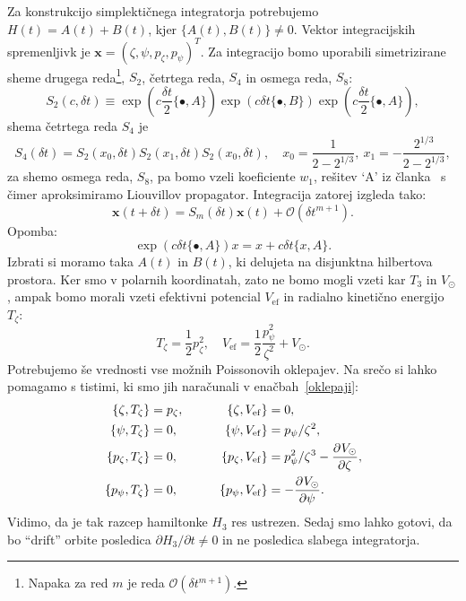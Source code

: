 \documentclass[12pt, a4paper]{article}
\newcommand{\sfrac}[2]{
    \ensuremath{\textstyle{\frac{#1}{#2}}}
}
\newcommand{\der}[3][]{
    \ensuremath{ \frac{\partial^{#1} #2}{\partial #3^{#1}} }
}
\newcommand{\Vef}{
    \ensuremath{V_\mathrm{ef}}
}
\begin{document}
Za konstrukcijo simplekti\v cnega integratorja potrebujemo $H(t) = A(t) + B(t)$, kjer $\{A(t), B(t)\} \neq 0$.
Vektor integracijskih spremenljivk je $\mathbf{x} = (\zeta, \psi, p_\zeta, p_\psi)^T$. Za integracijo bomo
uporabili simetrizirane sheme drugega reda\footnote{Napaka za red $m$ je reda $\mathcal{O}(\delta t^{m+1})$.},
$S_2$, \v cetrtega reda, $S_4$ in osmega reda, $S_8$:
\[
    S_2(c,\delta t) \equiv \exp(c\sfrac{\delta t}{2}\{\bullet, A\})\exp(c\delta t\{\bullet, B\})
    \exp(c\sfrac{\delta t}{2}\{\bullet, A\}),
\]
shema \v cetrtega reda $S_4$ je
\begin{equation}
    S_4(\delta t) = S_2(x_0, \delta t) S_2 (x_1, \delta t) S_2 (x_0, \delta t), \quad
        x_0 = \frac{1}{2 - 2^{1/3}},\ x_1 = -\frac{2^{1/3}}{2 - 2^{1/3}},
\end{equation}
za shemo osmega reda, $S_8$, pa bomo vzeli koeficiente $w_1$, re\v sitev `$\mathrm{A}$' iz \v clanka~\cite{yoshida}
s \v cimer aproksimiramo Liouvillov propagator. Integracija zatorej izgleda tako:
\[
	\mathbf{x}(t + \delta t) = S_m(\delta t) \mathbf{x}(t) + \mathcal{O}(\delta t^{m+1}).
\]
Opomba:
\[
    \exp(c\delta t\{\bullet, A\})x = x + c\delta t\{x, A\}.
\]
Izbrati si moramo taka $A(t)$ in $B(t)$, ki delujeta na disjunktna hilbertova prostora. Ker smo v polarnih koordinatah,
zato ne bomo mogli vzeti kar $T_3$ in $V_\odot$, ampak bomo morali vzeti efektivni potencial $\Vef$ in radialno
kineti\v cno energijo $T_\zeta$:
\begin{equation}
    T_\zeta = \frac{1}{2}p_\zeta^2, \quad \Vef = \frac{1}{2}\frac{p_\psi^2}{\zeta^2} + V_\odot.
\end{equation}
Potrebujemo \v se vrednosti vse mo\v znih Poissonovih oklepajev. Na sre\v co si lahko pomagamo s tistimi, ki
smo jih nara\v cunali v ena\v cbah~\eqref{oklepaji}:
\begin{alignat}{3}
    \{\zeta, T_\zeta\}        &= p_\zeta, \qquad &
    \{\zeta, \Vef\}           &= 0, \notag \\
    \{\psi, T_\zeta\}         &= 0, \qquad &
    \{\psi, \Vef\}            &= p_\psi/\zeta^2, \notag \\
    \{p_\zeta, T_\zeta\}      &= 0, \qquad&
    \{p_\zeta, \Vef\}         &= p^2_\psi/\zeta^3 - \der{V_\odot}{\zeta}, \notag \\
    \{p_\psi, T_\zeta\}       &= 0, \qquad &
    \{p_\psi, \Vef\}          &= -\der{V_\odot}{\psi}.
\end{alignat}
Vidimo, da je tak razcep hamiltonke $H_3$ res ustrezen. Sedaj smo lahko gotovi, da bo "`drift"' orbite posledica
$\partial H_3 / \partial t \neq 0$ in ne posledica slabega integratorja.
\end{document}
